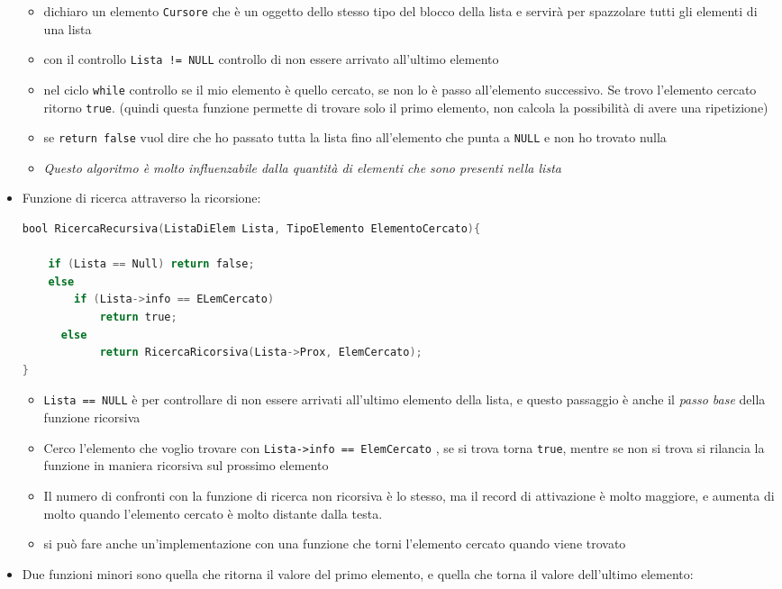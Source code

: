 \documentclass[
  paper=a4,
  oneside  ,captions=tableheading
]{scrbook}
\newcommand{\passthrough}[1]{#1}
\providecommand{\tightlist}{%
  \setlength{\itemsep}{0pt}\setlength{\parskip}{0pt}}
\begin{document}
\begin{itemize}
  \begin{itemize}
  \tightlist
  \item
    dichiaro un elemento \passthrough{\lstinline!Cursore!} che è un
    oggetto dello stesso tipo del blocco della lista e servirà per
    spazzolare tutti gli elementi di una lista
  \item
    con il controllo \passthrough{\lstinline"Lista != NULL"} controllo
    di non essere arrivato all'ultimo elemento
  \item
    nel ciclo \passthrough{\lstinline!while!} controllo se il mio
    elemento è quello cercato, se non lo è passo all'elemento
    successivo. Se trovo l'elemento cercato ritorno
    \passthrough{\lstinline!true!}. (quindi questa funzione permette di
    trovare solo il primo elemento, non calcola la possibilità di avere
    una ripetizione)
  \item
    se \passthrough{\lstinline!return false!} vuol dire che ho passato
    tutta la lista fino all'elemento che punta a
    \passthrough{\lstinline!NULL!} e non ho trovato nulla
  \item
    \emph{Questo algoritmo è molto influenzabile dalla quantità di
    elementi che sono presenti nella lista}
  \end{itemize}
\item
  Funzione di ricerca attraverso la ricorsione:

\begin{lstlisting}[language=C]
bool RicercaRecursiva(ListaDiElem Lista, TipoElemento ElementoCercato){

    if (Lista == Null) return false;
    else
        if (Lista->info == ELemCercato)
            return true;
      else
            return RicercaRicorsiva(Lista->Prox, ElemCercato);
}
\end{lstlisting}

  \begin{itemize}
  \tightlist
  \item
    \passthrough{\lstinline!Lista == NULL!} è per controllare di non
    essere arrivati all'ultimo elemento della lista, e questo passaggio
    è anche il \emph{passo base} della funzione ricorsiva
  \item
    Cerco l'elemento che voglio trovare con
    \passthrough{\lstinline!Lista->info == ElemCercato!} , se si trova
    torna \passthrough{\lstinline!true!}, mentre se non si trova si
    rilancia la funzione in maniera ricorsiva sul prossimo elemento
  \item
    Il numero di confronti con la funzione di ricerca non ricorsiva è lo
    stesso, ma il record di attivazione è molto maggiore, e aumenta di
    molto quando l'elemento cercato è molto distante dalla testa.
  \item
    si può fare anche un'implementazione con una funzione che torni
    l'elemento cercato quando viene trovato
  \end{itemize}
\item
  Due funzioni minori sono quella che ritorna il valore del primo
  elemento, e quella che torna il valore dell'ultimo elemento:


\end{itemize}
\end{document}
